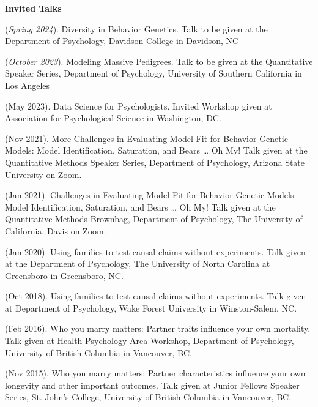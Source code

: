 {\large {\bf Invited Talks}}\begin{etaremune}

\item\meb (\textit{Spring 2024}). Diversity in Behavior Genetics. Talk to be given at the Department of Psychology, Davidson College in Davidson, NC 
%
\item\meb (\textit{October 2023}). Modeling Massive Pedigrees. Talk to be given at the Quantitative Speaker Series, Department of Psychology, University of Southern California in Los Angeles 
\item\meb (May 2023). Data Science for Psychologists. Invited Workshop given at Association for Psychological Science in Washington, DC.
\item\meb (Nov 2021). More Challenges in Evaluating Model Fit for Behavior Genetic Models: Model Identification, Saturation, and Bears … Oh My! Talk given at the Quantitative Methods Speaker Series, Department of Psychology, Arizona State University on Zoom.
%
\item\meb (Jan 2021). Challenges in Evaluating Model Fit for Behavior Genetic Models: Model Identification, Saturation, and Bears … Oh My! Talk given at the Quantitative Methods Brownbag, Department of Psychology, The University of California, Davis on Zoom.
%
\item\meb (Jan 2020). Using families to test causal claims without experiments. Talk given at the Department of Psychology, The University of North Carolina at Greensboro in Greensboro, NC.
%
%
%
\item\meb (Oct 2018). Using families to test causal claims without experiments. Talk given at Department of Psychology, Wake Forest University in Winston-Salem, NC.
%
\item \meb (Feb 2016). Who you marry matters: Partner traits influence your own mortality. Talk given at Health Psychology Area Workshop, Department of Psychology, University of British Columbia in Vancouver, BC. 
%
\item \meb (Nov 2015). Who you marry matters: Partner characteristics influence your own longevity and other important outcomes. Talk given at Junior Fellows Speaker Series, St. John's College, University of British Columbia in Vancouver, BC. \smallskip
\end{etaremune}\pagebreak
